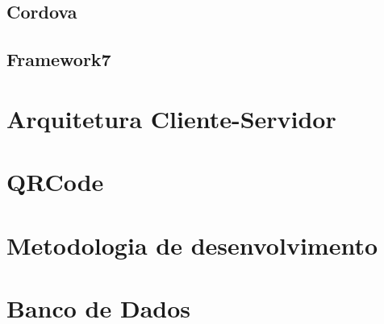 \subsection{Cordova}
\subsection{Framework7}

\section{Arquitetura Cliente-Servidor}

\section{QRCode}

\section{Metodologia de desenvolvimento}

\section{Banco de Dados}